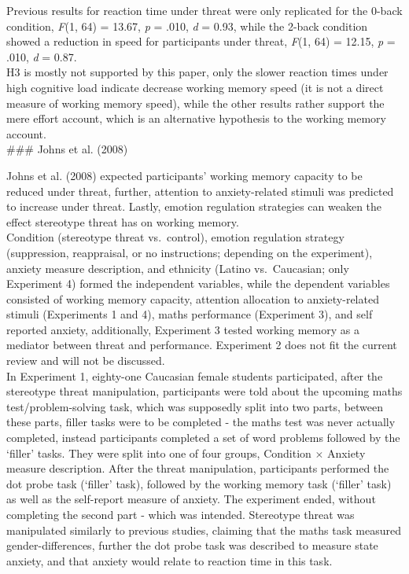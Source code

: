 \documentclass[
  stu,floatsintext]{apa7}
\begin{document}
Previous results for reaction time under threat were only replicated for the 0-back condition, \emph{F}(1, 64) = 13.67, \emph{p} = .010, \emph{d} = 0.93, while the 2-back condition showed a reduction in speed for participants under threat, \emph{F}(1, 64) = 12.15, \emph{p} = .010, \emph{d} = 0.87.\\
H3 is mostly not supported by this paper, only the slower reaction times under high cognitive load indicate decrease working memory speed (it is not a direct measure of working memory speed), while the other results rather support the mere effort account, which is an alternative hypothesis to the working memory account.\\
\#\#\# Johns et al. (2008)

Johns et al. (2008) expected participants' working memory capacity to be reduced under threat, further, attention to anxiety-related stimuli was predicted to increase under threat.
Lastly, emotion regulation strategies can weaken the effect stereotype threat has on working memory.\\
Condition (stereotype threat vs.~control), emotion regulation strategy (suppression, reappraisal, or no instructions; depending on the experiment), anxiety measure description, and ethnicity (Latino vs.~Caucasian; only Experiment 4) formed the independent variables, while the dependent variables consisted of working memory capacity, attention allocation to anxiety-related stimuli (Experiments 1 and 4), maths performance (Experiment 3), and self reported anxiety, additionally, Experiment 3 tested working memory as a mediator between threat and performance.
Experiment 2 does not fit the current review and will not be discussed.\\
In Experiment 1, eighty-one Caucasian female students participated, after the stereotype threat manipulation, participants were told about the upcoming maths test/problem-solving task, which was supposedly split into two parts, between these parts, filler tasks were to be completed - the maths test was never actually completed, instead participants completed a set of word problems followed by the `filler' tasks.
They were split into one of four groups, Condition \(\times\) Anxiety measure description.
After the threat manipulation, participants performed the dot probe task (`filler' task), followed by the working memory task (`filler' task) as well as the self-report measure of anxiety.
The experiment ended, without completing the second part - which was intended.
Stereotype threat was manipulated similarly to previous studies, claiming that the maths task measured gender-differences, further the dot probe task was described to measure state anxiety, and that anxiety would relate to reaction time in this task.
\end{document}
